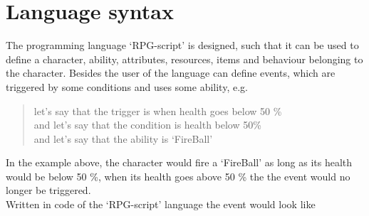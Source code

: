 \section{Language syntax}

The programming language `RPG-script' is designed, such that it can be used to define a character, ability, attributes, resources, items and behaviour belonging to the character. Besides the user of the language can define events, which are triggered by some conditions and uses some ability, e.g. 

\begin{quote}
	let's say that the trigger is when health goes below 50 \% \\
	and let's say that the condition is health below 50\% \\
	and let's say that the ability is `FireBall' \\
\end{quote}

In the example above, the character would fire a `FireBall' as long as its health would be below 50 \%, when its health goes above 50 \% the the event would no longer be triggered. \\
Written in code of the `RPG-script' language the event would look like


